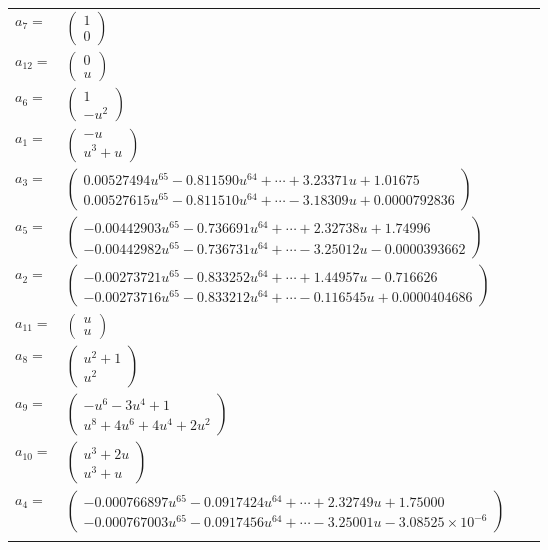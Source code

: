 \documentclass[1p]{elsarticle_modified}
\theoremstyle{definition}
\begin{document}
\begin{tabular}{m{7pt} m{180pt} m{7pt} m{180pt} }
\flushright $a_{7}=$&$\begin{pmatrix}1\\0\end{pmatrix}$ \\
\flushright $a_{12}=$&$\begin{pmatrix}0\\u\end{pmatrix}$ \\
\flushright $a_{6}=$&$\begin{pmatrix}1\\- u^2\end{pmatrix}$ \\
\flushright $a_{1}=$&$\begin{pmatrix}- u\\u^3+u\end{pmatrix}$ \\
\flushright $a_{3}=$&$\begin{pmatrix}0.00527494 u^{65}-0.811590 u^{64}+\cdots+3.23371 u+1.01675\\0.00527615 u^{65}-0.811510 u^{64}+\cdots-3.18309 u+0.0000792836\end{pmatrix}$ \\
\flushright $a_{5}=$&$\begin{pmatrix}-0.00442903 u^{65}-0.736691 u^{64}+\cdots+2.32738 u+1.74996\\-0.00442982 u^{65}-0.736731 u^{64}+\cdots-3.25012 u-0.0000393662\end{pmatrix}$ \\
\flushright $a_{2}=$&$\begin{pmatrix}-0.00273721 u^{65}-0.833252 u^{64}+\cdots+1.44957 u-0.716626\\-0.00273716 u^{65}-0.833212 u^{64}+\cdots-0.116545 u+0.0000404686\end{pmatrix}$ \\
\flushright $a_{11}=$&$\begin{pmatrix}u\\u\end{pmatrix}$ \\
\flushright $a_{8}=$&$\begin{pmatrix}u^2+1\\u^2\end{pmatrix}$ \\
\flushright $a_{9}=$&$\begin{pmatrix}- u^6-3 u^4+1\\u^8+4 u^6+4 u^4+2 u^2\end{pmatrix}$ \\
\flushright $a_{10}=$&$\begin{pmatrix}u^3+2 u\\u^3+u\end{pmatrix}$ \\
\flushright $a_{4}=$&$\begin{pmatrix}-0.000766897 u^{65}-0.0917424 u^{64}+\cdots+2.32749 u+1.75000\\-0.000767003 u^{65}-0.0917456 u^{64}+\cdots-3.25001 u-3.08525\times10^{-6}\end{pmatrix}$\\&\end{tabular}
\end{document}
